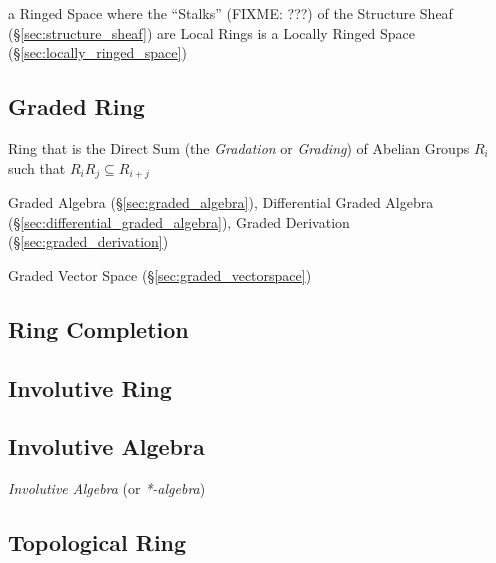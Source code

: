 a Ringed Space where the ``Stalks'' (FIXME: ???) of the Structure Sheaf
(\S\ref{sec:structure_sheaf}) are Local Rings is a Locally Ringed Space
(\S\ref{sec:locally_ringed_space})



\subsection{Graded Ring}\label{sec:graded_ring}

Ring that is the Direct Sum (the \emph{Gradation} or \emph{Grading}) of Abelian
Groups $R_i$ such that $R_iR_j \subseteq R_{i+j}$

Graded Algebra (\S\ref{sec:graded_algebra}),
Differential Graded Algebra (\S\ref{sec:differential_graded_algebra}),
Graded Derivation (\S\ref{sec:graded_derivation})

Graded Vector Space (\S\ref{sec:graded_vectorspace})



\subsection{Ring Completion}\label{sec:ring_completion}

\subsection{Involutive Ring}\label{sec:involutive_ring}

\subsection{Involutive Algebra}\label{sec:involutive_algebra}

\emph{Involutive Algebra} (or \emph{*-algebra})



\subsection{Topological Ring}\label{sec:topological_ring}



